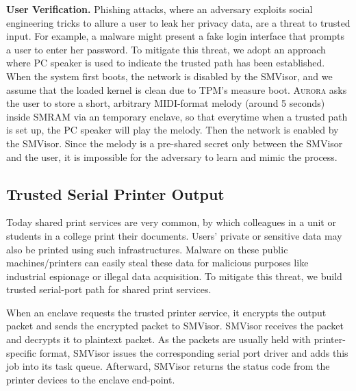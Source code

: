 \textbf{User Verification.}
Phishing attacks, where an adversary exploits social engineering tricks to allure a user to leak her privacy data, are a threat to trusted input. For example, a malware might present a fake login interface that prompts a user to enter her password.
To mitigate this threat, we adopt an approach where PC speaker is used to indicate the trusted path has been established.
When the system first boots, the network is disabled by the SMVisor, and we assume that the loaded kernel is clean due to TPM's measure boot. \textsc{Aurora} asks the user to store a short, arbitrary MIDI-format melody (around 5 seconds) inside SMRAM via an temporary enclave, so that everytime when a trusted path is set up, the PC speaker will play the melody. Then the network is enabled by the SMVisor. Since the melody is a pre-shared secret only between the SMVisor and the user, it is impossible for the adversary to learn and mimic the process.

\subsection{Trusted Serial Printer Output}\label{output_service}
Today shared print services are very common, by which colleagues in a unit or students in a college print their documents. Users' private or sensitive data may also be printed using such infrastructures. Malware on these public machines/printers can easily steal these data for malicious purposes like industrial espionage or illegal data acquisition. To mitigate this threat, we build trusted serial-port path for shared print services.

When an enclave requests the trusted printer service, it encrypts the output packet and sends the encrypted packet to SMVisor.  SMVisor receives the packet and decrypts it to plaintext packet. As the packets are usually held with printer-specific format, SMVisor issues the corresponding serial port driver and adds this job into its task queue. Afterward, SMVisor returns the status code from the printer devices to the enclave end-point.

